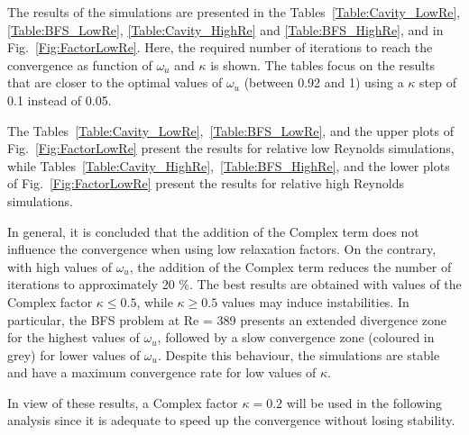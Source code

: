 \documentclass[final,3p,times,11pt,onecolumn]{myElsarticle}
\numberwithin{equation}{section}
\begin{document}
The results of the simulations are presented in the Tables~\ref{Table:Cavity_LowRe}, \ref{Table:BFS_LowRe}, \ref{Table:Cavity_HighRe} and \ref{Table:BFS_HighRe}, and in Fig.~\ref{Fig:FactorLowRe}. Here, the required number of iterations to reach the convergence as function of $\omega_u$ and $\kappa$ is shown. The tables focus on the results that are closer to the optimal values of $\omega_u$ (between 0.92 and 1) using a $\kappa$ step of 0.1 instead of 0.05. 
 
The Tables~\ref{Table:Cavity_LowRe},~\ref{Table:BFS_LowRe}, and the upper plots of Fig.~\ref{Fig:FactorLowRe} present the results for relative low Reynolds simulations, while Tables~\ref{Table:Cavity_HighRe},~\ref{Table:BFS_HighRe}, and the lower plots of Fig.~\ref{Fig:FactorLowRe} present the results for relative high Reynolds simulations. 

In general, it is concluded that the addition of the Complex term does not influence the convergence when using low relaxation factors. On the contrary, with high values of $\omega_u$, the addition of the Complex term reduces the number of iterations to approximately 20 $\%$. The best results are obtained with values of the Complex factor $\kappa \leq 0.5$, while $\kappa \geq 0.5$ values may induce instabilities. In particular, the BFS problem at Re = 389 presents an extended divergence zone for the highest values of $\omega_u$, followed by a slow convergence zone (coloured in grey) for lower values of $\omega_u$. Despite this behaviour, the simulations are stable and have a maximum convergence rate for low values of $\kappa$.

In view of these results, a Complex factor $\kappa = 0.2$ will be used in the following analysis since it is adequate to speed up the convergence without losing stability. %
\end{document}
